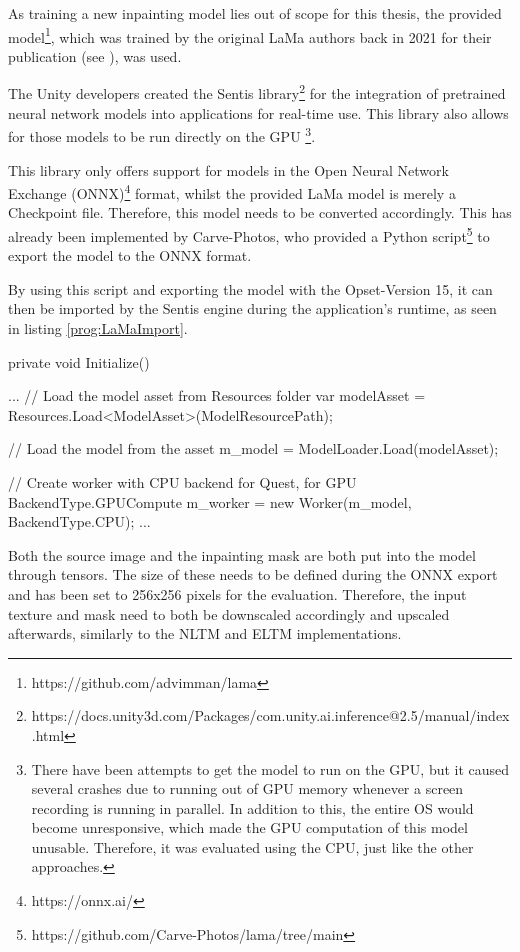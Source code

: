 As training a new inpainting model lies out of scope for this thesis, the provided model\footnote{https://github.com/advimman/lama}, which was trained by the original LaMa authors back in 2021 for their publication (see \cite{SuvorovRoman2022RLMI}), was used.

The Unity developers created the Sentis library\footnote{https://docs.unity3d.com/Packages/com.unity.ai.inference@2.5/manual/index.html} for the integration of pretrained neural network models into applications for real-time use. This library also allows for those models to be run directly on the GPU \cite{UnitySentis}\footnote{There have been attempts to get the model to run on the GPU, but it caused several crashes due to running out of GPU memory whenever a screen recording is running in parallel.
In addition to this, the entire OS would become unresponsive, which made the GPU computation of this model unusable. Therefore, it was evaluated using the CPU, just like the other approaches.}.

This library only offers support for models in the Open Neural Network Exchange (ONNX)\footnote{https://onnx.ai/} format, whilst the provided LaMa model is merely a Checkpoint file. Therefore, this model needs to be converted accordingly. This has already been implemented by Carve-Photos, who provided a Python script\footnote{https://github.com/Carve-Photos/lama/tree/main} to export the model to the ONNX format.

By using this script and exporting the model with the Opset-Version 15, it can then be imported by the Sentis engine during the application's runtime, as seen in listing \ref{prog:LaMaImport}.

\begin{listing}[ht!]
\caption{LaMa Model Initialization}
\label{prog:LaMaImport}
\begin{CsCodeCust}
private void Initialize() {
    ...
    // Load the model asset from Resources folder
    var modelAsset = Resources.Load<ModelAsset>(ModelResourcePath);

    // Load the model from the asset
    m_model = ModelLoader.Load(modelAsset);

    // Create worker with CPU backend for Quest, for GPU BackendType.GPUCompute
    m_worker = new Worker(m_model, BackendType.CPU);
    ...
}
\end{CsCodeCust}
\end{listing}

Both the source image and the inpainting mask are both put into the model through tensors.
The size of these needs to be defined during the ONNX export and has been set to 256x256 pixels for the evaluation. Therefore, the input texture and mask need to both be downscaled accordingly and upscaled afterwards, similarly to the NLTM and ELTM implementations.

